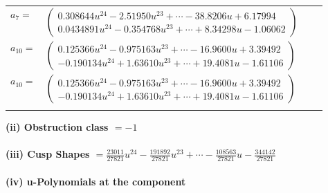 \documentclass[1p]{elsarticle_modified}
\theoremstyle{definition}
\begin{document}
\begin{tabular}{m{7pt} m{180pt} m{7pt} m{180pt} }
\flushright $a_{7}=$&$\begin{pmatrix}0.308644 u^{24}-2.51950 u^{23}+\cdots-38.8206 u+6.17994\\0.0434891 u^{24}-0.354768 u^{23}+\cdots+8.34298 u-1.06062\end{pmatrix}$ \\
\flushright $a_{10}=$&$\begin{pmatrix}0.125366 u^{24}-0.975163 u^{23}+\cdots-16.9600 u+3.39492\\-0.190134 u^{24}+1.63610 u^{23}+\cdots+19.4081 u-1.61106\end{pmatrix}$\\ \flushright $a_{10}=$&$\begin{pmatrix}0.125366 u^{24}-0.975163 u^{23}+\cdots-16.9600 u+3.39492\\-0.190134 u^{24}+1.63610 u^{23}+\cdots+19.4081 u-1.61106\end{pmatrix}$\\&\end{tabular}
\flushleft \textbf{(ii) Obstruction class $= -1$}\\~\\
\flushleft \textbf{(iii) Cusp Shapes $= \frac{23011}{27821} u^{24}-\frac{191892}{27821} u^{23}+\cdots-\frac{108563}{27821} u-\frac{344142}{27821}$}\\~\\
\newpage\renewcommand{\arraystretch}{1}
\flushleft \textbf{(iv) u-Polynomials at the component}\newline \\
\end{document}
